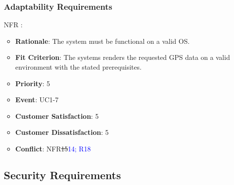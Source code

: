 \documentclass[12pt, titlepage]{article}
\newcounter{reqnum} %
\newcounter{freqnum} %
\begin{document}
\begin{itemize}
\subsubsection{Adaptability Requirements}
\item[NFR\refstepcounter{freqnum}\thefreqnum
\label{NFR}:] 
\begin{itemize}
    \item \textbf{Rationale}: The system must be functional on a valid OS.
    \item \textbf{Fit Criterion}: The systems renders the requested GPS data on a valid environment with the stated prerequisites.
    \item \textbf{Priority}: 5
    \item \textbf{Event}: UC1-7%
    \item \textbf{Customer Satisfaction}: 5
    \item \textbf{Customer Dissatisfaction}: 5
    \item \textbf{Conflict}: NFR\sout{15}\textcolor{blue}{14; R18}
\end{itemize}
\subsection{Security Requirements}


\end{itemize}
\end{document}
